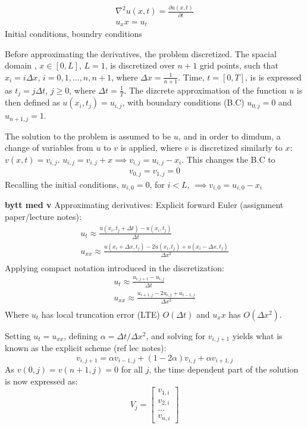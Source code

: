\documentclass[%
oneside,                 %
final,                   %
10pt]{article}
\begin{document}
\begin{align}
\nabla^2u(x,t)=\frac{\partial u(x,t)}{\partial t} \\
u_xx=u_t
\end{align}
Initial conditions, boundry conditions \newline

Before approximating the derivatives, the problem discretized. The spacial domain , $x \in [0,L]$, $L=1$, is discretized over $n+1$ grid points, such that $x_i=i \Delta x$, $i=0,1,...,n,n+1$, where $\Delta x= \frac{1}{n+1}$. Time, $t=[0,T]$, is is expressed as $t_j=j \Delta t$, $j\geq 0$, where $\Delta t=\frac{1}{T}$. The dizcrete approximation of the function $u$ is then defined as $u(x_i,t_j)=u_{i,j}$, with boundary conditions (B.C) $u_{0,j}=0$ and $u_{n+1,j}=1$. \newline

The solution to the problem is assumed to be $u$, and in order to dimdum, a change of variables from $u$ to $v$ is applied, where $v$ is discretized similarly to $x$: $v(x,t)=v_{i,j}$.  $u_{i,j}=v_{i,j}+x \implies v_{i,j}=u_{i,j}-x_i$. This changes the B.C to \begin{align*}
v_{0,j}=v_{1,j}=0
\end{align*}
Recalling the initial conditions, $u_{i,0}=0$, for $i<L$, $ \implies v_{i,0}=u_{i,0}-x_i$

\textbf{bytt med v}
Approximating derivatives:
Explicit forward Euler (assignment paper/lecture notes):
\begin{align}
u_t \approx \frac{u(x_i,t_j+\Delta t) -u(x_i,t_j)}{\Delta t} \\
u_{xx} \approx \frac{u(x_i+\Delta x,t_j) -2u(x_i,t_j)+u(x_i-\Delta x,t_j)}{\Delta x^2}\\
\end{align}
Applying compact notation introduced in the discretization:
\begin{align}
u_t \approx \frac{u_{i,j+1} -u_{i,j}}{\Delta t} \\
u_{xx} \approx \frac{u_{i+1,j} -2u_{i,j}+u_{i-1,j}}{\Delta x^2}\\
\end{align}
Where $u_t$ has local truncation error (LTE) $O(\Delta t)$ and  $u_xx$ has $O(\Delta x^2)$. \newline

Setting $u_t=u_{xx}$, defining $\alpha = \Delta t/\Delta x^2$, and solving for $v_{i,j+1}$ yields what is known as the explicit scheme (ref lec notes): 
\begin{equation}
v_{i,j+1}=\alpha v_{i-1,j}+(1-2 \alpha)v_{i,j}+\alpha v_{i+1,j}
\end{equation}
As $v(0,j)=v(n+1,j)=0$ for all $j$, the time dependent part of the solution is now expressed as:
\begin{equation} V_j=
\begin{bmatrix}
v_{1,i} \\ v_{2,i} \\ ...\\ v_{n,i}
\end{bmatrix}
\end{equation}
\end{document}
